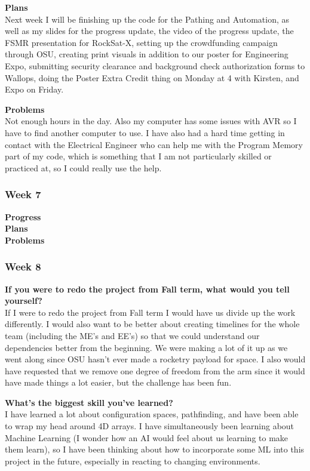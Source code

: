\textbf{Plans} \\ 
Next week I will be finishing up the code for the Pathing and Automation, as well as my slides for the progress update, the video of the progress update, the FSMR presentation for RockSat-X, setting up the crowdfunding campaign through OSU, creating print visuals in addition to our poster for Engineering Expo, submitting security clearance and background check authorization forms to Wallops, doing the Poster Extra Credit thing on Monday at 4 with Kirsten, and Expo on Friday.

\textbf{Problems} \\ 
Not enough hours in the day. Also my computer has some issues with AVR so I have to find another computer to use. I have also had a hard time getting in contact with the Electrical Engineer who can help me with the Program Memory part of my code, which is something that I am not particularly skilled or practiced at, so I could really use the help.


\subsubsection{Week 7}
\textbf{Progress} \\ 
\textbf{Plans} \\ 
\textbf{Problems} \\ 

\subsubsection{Week 8}
\textbf{If you were to redo the project from Fall term, what would you tell yourself?} \\ 
If I were to redo the project from Fall term I would have us divide up the work differently. I would also want to be better about creating timelines for the whole team (including the ME's and EE's) so that we could understand our dependencies better from the beginning. We were making a lot of it up as we went along since OSU hasn't ever made a rocketry payload for space. I also would have requested that we remove one degree of freedom from the arm since it would have made things a lot easier, but the challenge has been fun.

\textbf{What's the biggest skill you've learned?} \\ 
I have learned a lot about configuration spaces, pathfinding, and have been able to wrap my head around 4D arrays. I have simultaneously been learning about Machine Learning (I wonder how an AI would feel about us learning to make them learn), so I have been thinking about how to incorporate some ML into this project in the future, especially in reacting to changing environments.

